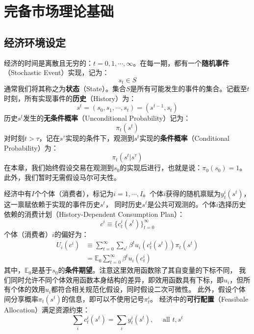 
\section{完备市场理论基础}  \label{sec-complete-market}


\subsection{经济环境设定}

经济的时间是离散且无穷的：$t=0,1,\cdots, \infty$。在每一期，都有一个\textbf{随机事件}（Stochastic Event）实现，记为：
$$s_t\in S$$
通常我们将其称之为\textbf{状态}（State）。集合$S$是所有可能发生的事件的集合。记截至$t$时刻，所有实现事件的\textbf{历史}（History）为：
$$s^t = \left(s_0,s_1,\cdots,s_t\right) = \left(s^{t-1},s_t\right)$$
历史$s^t$发生的\textbf{无条件概率}（Unconditional Probability）记为：
$$\pi_t\left(s^t\right)$$
对时刻$t>\tau$，记在$s^{\tau}$实现的条件下，观测到$s^t$实现的\textbf{条件概率}（Conditional Probability）为：
$$\pi_t\left(s^t|s^{\tau}\right)$$
在本章，我们始终假设交易在观测到$s_0$的实现后进行，也就是说：$\pi_0\left(s_0\right)=1$。此外，我们暂时无需假设马尔可夫性。

经济中有$I$个个体（消费者），标记为$i=1,\cdots, I$。个体$i$获得的随机禀赋为$y_t^i\left(s^t\right)$，这一禀赋依赖于实现的事件历史$s^t$，
同时历史$s^t$是公共可观测的。个体$i$选择历史依赖的消费计划（History-Dependent Consumption Plan）：
$$
c^i \equiv \{c_t^i\left(s^t\right)\}_{t=0}^{\infty}
$$
个体（消费者）$i$的偏好为：
\begin{equation}    \label{eq-cm-preference-i}
    \begin{aligned}
        U_i\left(c^i\right) &\equiv \sum_{t=0}^{\infty} \sum_{s^t} \beta^t u_i\left(c_t^i\left(s^t\right)\right) \pi_t\left(s^t\right) \\
            &= \mathbb{E}_0 \sum_{t=0}^{\infty} \beta^t u_i\left(c_t^i\right)
    \end{aligned}
\end{equation}
其中，$\mathbb{E}_0$是基于$s_0$的\textbf{条件期望}。注意这里效用函数除了其自变量的下标不同，
我们同时允许不同个体效用函数本身结构的差异，即效用函数具有下标，即$u_i$，但所有个体的效用$u_i$都符合相关规范化假设，同时假设二次可微性。
此外，假设个体间分享概率$\pi_t\left(s^t\right)$的信息，即可以不使用记号$\pi_t^i$。
经济中的\textbf{可行配置}（Feasibale Allocation）满足资源约束：
\begin{equation}    \label{eq-cm-rc}
    \sum_i c_t^i\left(s^t\right) = \sum_i y_t^i\left(s^t\right), \quad \text { all } t, s^t
\end{equation}


